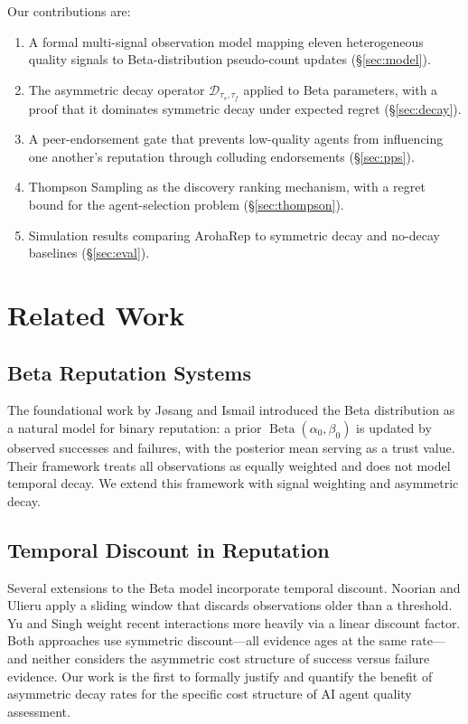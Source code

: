 \documentclass[conference]{IEEEtran}
\DeclareMathOperator{\Beta}{\mathrm{Beta}}
\begin{document}
Our contributions are:
\begin{enumerate}
  \item A formal multi-signal observation model mapping eleven
    heterogeneous quality signals to Beta-distribution
    pseudo-count updates (\S\ref{sec:model}).
  \item The asymmetric decay operator $\mathcal{D}_{\tau_s,
    \tau_f}$ applied to Beta parameters, with a proof that
    it dominates symmetric decay under expected regret
    (\S\ref{sec:decay}).
  \item A peer-endorsement gate that prevents low-quality
    agents from influencing one another's reputation through
    colluding endorsements (\S\ref{sec:pps}).
  \item Thompson Sampling as the discovery ranking mechanism,
    with a regret bound for the agent-selection problem
    (\S\ref{sec:thompson}).
  \item Simulation results comparing ArohaRep to symmetric
    decay and no-decay baselines (\S\ref{sec:eval}).
\end{enumerate}

\section{Related Work}
\label{sec:related}

\subsection{Beta Reputation Systems}

The foundational work by J{\o}sang and Ismail \cite{josang2002beta}
introduced the Beta distribution as a natural model for binary
reputation: a prior $\Beta(\alpha_0, \beta_0)$ is updated by
observed successes and failures, with the posterior mean
serving as a trust value. Their framework treats all
observations as equally weighted and does not model temporal
decay. We extend this framework with signal weighting and
asymmetric decay.

\subsection{Temporal Discount in Reputation}

Several extensions to the Beta model incorporate temporal
discount. Noorian and Ulieru \cite{ziegler2005propagation}
apply a sliding window that discards observations older than
a threshold. Yu and Singh \cite{yu2002peertrust} weight
recent interactions more heavily via a linear discount factor.
Both approaches use symmetric discount—all evidence ages at
the same rate—and neither considers the asymmetric cost
structure of success versus failure evidence. Our work is the
first to formally justify and quantify the benefit of
asymmetric decay rates for the specific cost structure of
AI agent quality assessment.
\end{document}
